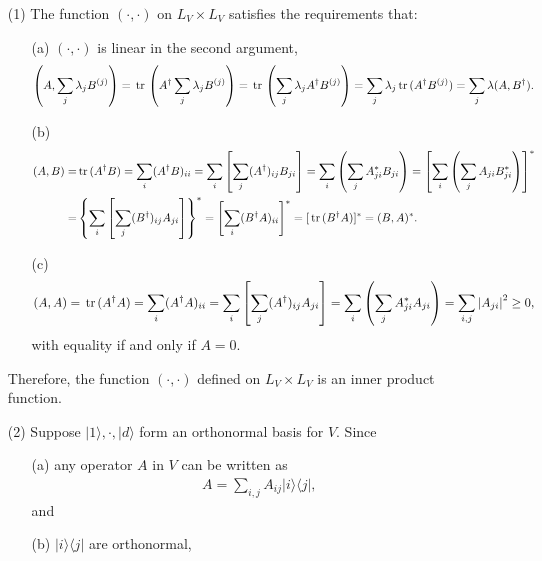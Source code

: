 \documentclass[en]{sol-man}
\begin{document}
\begin{sol}
    \begin{itemize}
        \item[(1)] The function $(\cdot,\cdot)$ on $L_V\times L_V$ satisfies the requirements that:
        \begin{itemize}
            \item[(a)] $(\cdot,\cdot)$ is linear in the second argument,
            \begin{align}
                \left(A,\sum_j\lambda_jB^{(j)}\right)=\,\mathrm{tr}\,\left(A^{\dagger}\sum_j\lambda_jB^{(j)}\right)=\,\mathrm{tr}\,\left(\sum_j\lambda_jA^{\dagger}B^{(j)}\right)=\sum_j\lambda_j\,\mathrm{tr}\,(A^{\dagger}B^{(j)})=\sum_j\lambda(A,B^{\dagger}).
            \end{align}
            \item[(b)] 
            \begin{align}
                \notag(A,B)=&\,\mathrm{tr}\,(A^{\dagger}B)=\sum_i(A^{\dagger}B)_{ii}=\sum_i\left[\sum_j(A^{\dagger})_{ij}B_{ji}\right]=\sum_i\left(\sum_jA_{ji}^*B_{ji}\right)=\left[\sum_i\left(\sum_jA_{ji}B_{ji}^*\right)\right]^*\\
                =&\left\{\sum_i\left[\sum_j(B^{\dagger})_{ij}A_{ji}\right]\right\}^*=\left[\sum_i(B^{\dagger}A)_{ii}\right]^*=[\,\mathrm{tr}\,(B^{\dagger}A)]^*=(B,A)^*.
            \end{align}
            \item[(c)] 
            \begin{align}
                (A,A)=\,\mathrm{tr}\,(A^{\dagger}A)=\sum_i(A^{\dagger}A)_{ii}=\sum_i\left[\sum_j(A^{\dagger})_{ij}A_{ji}\right]=\sum_i\left(\sum_jA_{ji}^*A_{ji}\right)=\sum_{i,j}\left\lvert A_{ji}\right\rvert^2\geq 0,
            \end{align}
            with equality if and only if $A=0$.
        \end{itemize}
        Therefore, the function $(\cdot,\cdot)$ defined on $L_V\times L_V$ is an inner product function.
        \item[(2)] Suppose $\lvert 1\rangle,\cdot,\lvert d\rangle$ form an orthonormal basis for $V$. Since
        \begin{itemize}
            \item[(a)] any operator $A$ in $V$ can be written as
            \begin{align}
                A=\sum_{i,j}A_{ij}\lvert i\rangle\langle j\rvert,
            \end{align}
            and
            \item[(b)] $\lvert i\rangle\langle j\rvert$ are orthonormal,

\end{itemize}
\end{itemize}
\end{sol}
\end{document}

